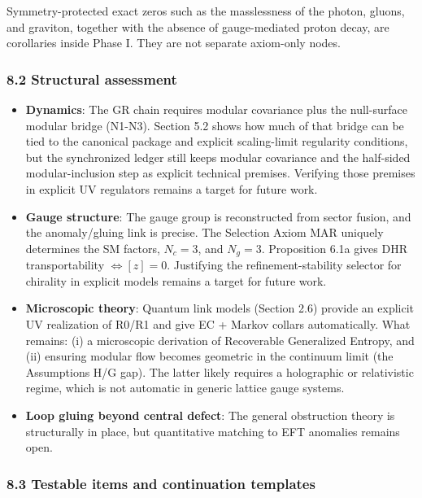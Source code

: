 Symmetry-protected exact zeros such as the masslessness of the photon, gluons, and graviton, together with the absence of gauge-mediated proton decay, are corollaries inside Phase I. They are not separate axiom-only nodes.
\subsubsection{8.2 Structural assessment}\label{82-structural-assessment}

\begin{itemize}
\tightlist
\item
  \textbf{Dynamics}: The GR chain requires modular covariance plus the null-surface modular bridge (N1-N3). Section 5.2 shows how much of that bridge can be tied to the canonical package and explicit scaling-limit regularity conditions, but the synchronized ledger still keeps modular covariance and the half-sided modular-inclusion step as explicit technical premises. Verifying those premises in explicit UV regulators remains a target for future work.
\item
  \textbf{Gauge structure}: The gauge group is reconstructed from sector fusion, and the anomaly/gluing link is precise. The Selection Axiom MAR uniquely determines the SM factors, \(N_c = 3\), and \(N_g = 3\). Proposition 6.1a gives DHR transportability \(\Leftrightarrow [z]=0\). Justifying the refinement-stability selector for chirality in explicit models remains a target for future work.
\item
  \textbf{Microscopic theory}: Quantum link models (Section 2.6) provide an explicit UV realization of R0/R1 and give EC + Markov collars automatically. What remains: (i) a microscopic derivation of Recoverable Generalized Entropy, and (ii) ensuring modular flow becomes geometric in the continuum limit (the Assumptions H/G gap). The latter likely requires a holographic or relativistic regime, which is not automatic in generic lattice gauge systems.
\item
  \textbf{Loop gluing beyond central defect}: The general obstruction theory is structurally in place, but quantitative matching to EFT anomalies remains open.
\end{itemize}

\subsubsection{8.3 Testable items and continuation templates}\label{83-novel-testable-predictions}

